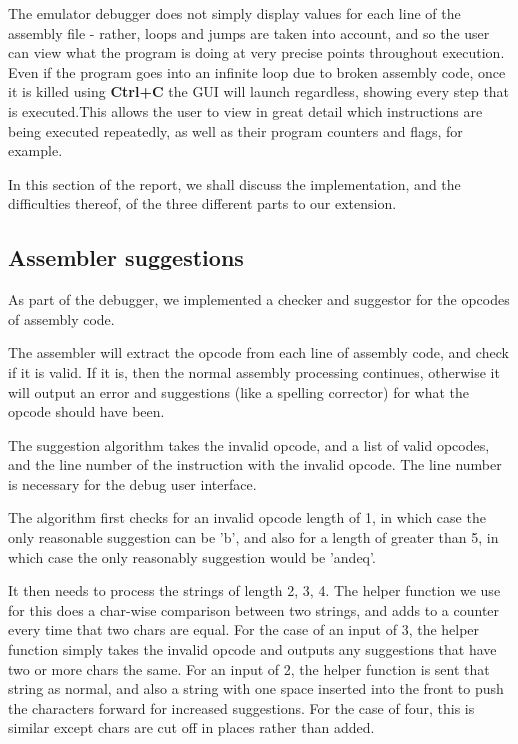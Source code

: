 \documentclass[11pt]{article}
\begin{document}
The emulator debugger does not simply display values for each line of the assembly file - rather, loops and jumps are taken into account, and so the user can view what the program is doing at very precise points throughout execution. Even if the program goes into an infinite loop due to broken assembly code, once it is killed using {\bf Ctrl+C} the GUI will launch regardless, showing every step that is executed.This allows the user to view in great detail which instructions are being executed repeatedly, as well as their program counters and flags, for example.

In this section of the report, we shall discuss the implementation, and the difficulties thereof, of the three different parts to our extension.

\subsection{Assembler suggestions}
As part of the debugger, we implemented a checker and suggestor for the opcodes of assembly code.

The assembler will extract the opcode from each line of assembly code, and check if it is valid. If it is, then the normal assembly processing continues, otherwise it will output an error and suggestions (like a spelling corrector) for what the opcode should have been.

The suggestion algorithm takes the invalid opcode, and a list of valid opcodes, and the line number of the instruction with the invalid opcode. The line number is necessary for the debug user interface.

The algorithm first checks for an invalid opcode length of 1, in which case the only reasonable suggestion can be 'b', and also for a length of greater than 5, in which case the only reasonably suggestion would be 'andeq'.

It then needs to process the strings of length 2, 3, 4. The helper function we use for this does a char-wise comparison between two strings, and adds to a counter every time that two chars are equal. For the case of an input of 3, the helper function simply takes the invalid opcode and outputs any suggestions that have two or more chars the same. For an input of 2, the helper function is sent that string as normal, and also a string with one space inserted into the front to push the characters forward for increased suggestions. For the case of four, this is similar except chars are cut off in places rather than added.
\end{document}
